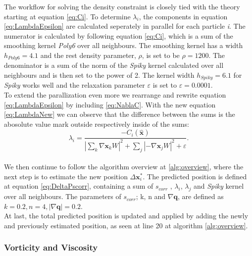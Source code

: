 The workflow for solving the density constraint is closely tied with the theory starting at equation \ref{eq:Ci}. 
To determine $\lambda_{i}$, the components in equation \ref{eq:LambdaEpsilon} are calculated seperately in parallel 
for each particle \textit{i}.
The numerator is calculated by following equation \ref{eq:Ci}, which is a sum of the smoothing kernel \textit{Poly6} over 
all neighbours. The smoothing kernel has a width $h_{Poly6} = 4.1$ and the rest density parameter, $\rho$, is set to be $\rho = 1200$. 
The denominator is a sum of the norm of the \textit{Spiky} kernel calculated over all neighbours 
and is then set to the power of 2. The kernel width $h_{Spiky} = 6.1$ for \textit{Spiky} works well and the 
relaxation parameter $\varepsilon$ is set to $\varepsilon = 0.0001$.
\\
\newline
To extend the parallization even more we rearrange and rewrite equation \ref{eq:LambdaEpsilon} by including \ref{eq:NablaC}. With the 
new equation \ref{eq:LambdaNew} we can observe that the difference between the sums is the abosolute value mark 
outside respectively inside of the sums: 
\\
\begin{equation}
\label{eq:LambdaNew}
\lambda_i = \frac{- C_i(\hat{\mathbf{x}}) }{ |\sum\limits_{k} \nabla \mathbf{x}_k W|^{2} + \sum\limits_{j} |-\nabla \mathbf{x}_j W|^2  + \varepsilon}.
\end{equation}
\\
\newline
We then continue to follow the algorithm overview at \ref{alg:overview}, where the next step is to estimate the new position $\Delta \mathbf{x}^{*}_{i}$.
The predicted position is defined at equation \ref{eq:DeltaPscorr}, containing a sum of $s_{corr}$ , $\lambda_{i}$, $\lambda_{j}$ 
and \textit{Spiky} kernel over all neighbours. 
The parameters of $s_{corr}$; k, n and $ \nabla \mathbf{q}$, are defined as $k = 0.2, n = 4, |\nabla \mathbf{q}| = 0.2$. 
\\
At last, the total predicted position is updated and applied by adding the newly and previously estimated position, 
as seen at line 20 at algorithm \ref{alg:overview}.

\subsubsection{Vorticity and Viscosity}
